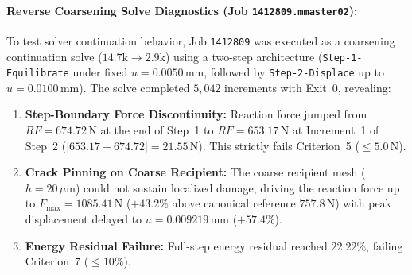 \paragraph{Reverse Coarsening Solve Diagnostics (Job \texttt{1412809.mmaster02}):}
To test solver continuation behavior, Job \texttt{1412809} was executed as a coarsening continuation solve ($14.7\mathrm{k} \to 2.9\mathrm{k}$) using a two-step architecture (\texttt{Step-1-Equilibrate} under fixed $u=0.0050\,\mathrm{mm}$, followed by \texttt{Step-2-Displace} up to $u=0.0100\,\mathrm{mm}$). The solve completed $5{,}042$ increments with Exit~0, revealing:
\begin{enumerate}
  \item \textbf{Step-Boundary Force Discontinuity:} Reaction force jumped from $RF = 674.72\,\mathrm{N}$ at the end of Step~1 to $RF = 653.17\,\mathrm{N}$ at Increment~1 of Step~2 ($|653.17 - 674.72| = 21.55\,\mathrm{N}$). This strictly fails Criterion~5 ($\le 5.0\,\mathrm{N}$).
  \item \textbf{Crack Pinning on Coarse Recipient:} The coarse recipient mesh ($h = 20\,\mu\mathrm{m}$) could not sustain localized damage, driving the reaction force up to $F_{\max} = 1085.41\,\mathrm{N}$ ($+43.2\%$ above canonical reference $757.8\,\mathrm{N}$) with peak displacement delayed to $u = 0.009219\,\mathrm{mm}$ ($+57.4\%$).
  \item \textbf{Energy Residual Failure:} Full-step energy residual reached $22.22\%$, failing Criterion~7 ($\le 10\%$).
\end{enumerate}

